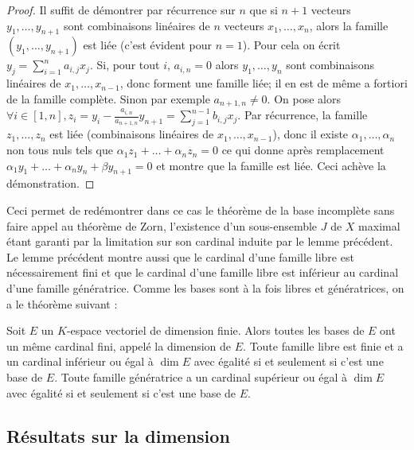 \begin{proof}
Il suffit de démontrer par récurrence sur $n$ que si $n+1$ vecteurs $y_1,\ldots,y_{n+1}$ sont combinaisons linéaires de $n$ vecteurs $x_1,\ldots,x_n$, alors la famille $(y_1,\ldots,y_{n+1})$ est liée (c'est évident pour $n=1$). Pour cela on écrit $y_j = \sum_{i=1}^n a_{i,j} x_j$. Si, pour tout $i$, $a_{i,n} = 0$ alors $y_1,\ldots,y_n$ sont combinaisons linéaires de $x_1,\ldots,x_{n-1}$, donc forment une famille liée; il en est de même a fortiori de la famille complète. Sinon par exemple $a_{n+1,n} \neq 0$. On pose alors $\forall i \in [1,n], z_i = y_i - \frac{a_{i,n}}{a_{n+1,n}} y_{n+1} = \sum_{j=1}^{n-1} b_{i,j} x_j$. Par récurrence, la famille $z_1,\ldots,z_n$ est liée (combinaisons linéaires de $x_1,\ldots,x_{n-1}$), donc il existe $\alpha_1,\ldots,\alpha_n$ non tous nuls tels que $\alpha_1 z_1 + \ldots + \alpha_n z_n = 0$ ce qui donne après remplacement $\alpha_1 y_1 + \ldots + \alpha_n y_n + \beta y_{n+1} = 0$ et montre que la famille est liée. Ceci achève la démonstration.
\end{proof}

\begin{rem}
Ceci permet de redémontrer dans ce cas le théorème de la base incomplète sans faire appel au théorème de Zorn, l'existence d'un sous-ensemble $J$ de $X$ maximal étant garanti par la limitation sur son cardinal induite par le lemme précédent. Le lemme précédent montre aussi que le cardinal d'une famille libre est nécessairement fini et que le cardinal d'une famille libre est inférieur au cardinal d'une famille génératrice. Comme les bases sont à la fois libres et génératrices, on a le théorème suivant :
\end{rem}

\begin{thm}
Soit $E$ un $K$-espace vectoriel de dimension finie. Alors toutes les bases de $E$ ont un même cardinal fini, appelé la dimension de $E$. Toute famille libre est finie et a un cardinal inférieur ou égal à $\dim E$ avec égalité si et seulement si c'est une base de $E$. Toute famille génératrice a un cardinal supérieur ou égal à $\dim E$ avec égalité si et seulement si c'est une base de $E$.
\end{thm}

\subsection{Résultats sur la dimension}

